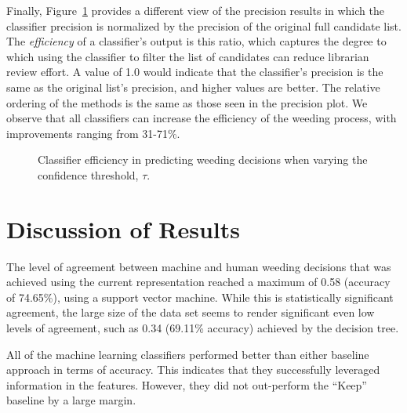 \documentclass[man,11pt]{apa6}
\begin{document}
Finally, Figure~\ref{fig:eff} provides a different view of the
precision results in which the classifier precision is normalized by
the precision of the original full candidate list.  The {\em
  efficiency} of a classifier's output is this ratio, which captures
the degree to which using the classifier to filter the list of
candidates can reduce librarian review effort.  A value of 1.0 would
indicate that the classifier's precision is the same as the original
list's precision, and higher values are better.  The relative ordering
of the methods is the same as those seen in the precision plot.  We
observe that all classifiers can increase the efficiency of the
weeding process, with improvements ranging from 31-71\%.

\begin{figure}
\centering
\caption{Classifier efficiency in predicting weeding decisions when
  varying the confidence threshold, $\tau$.}
\label{fig:eff}
\end{figure}

\section{Discussion of Results}

The level of agreement between machine and human weeding decisions
that was achieved using the current representation reached a maximum
of 0.58 (accuracy of 74.65\%), using a support vector machine.  While
this is statistically significant agreement, the large size of the
data set seems to render significant even low levels of agreement,
such as 0.34 (69.11\% accuracy) achieved by the decision tree.

All of the machine learning classifiers performed better than either
baseline approach in terms of accuracy.  This indicates that they
successfully leveraged information in the features.  However, they did
not out-perform the ``Keep'' baseline by a large margin.
\end{document}
